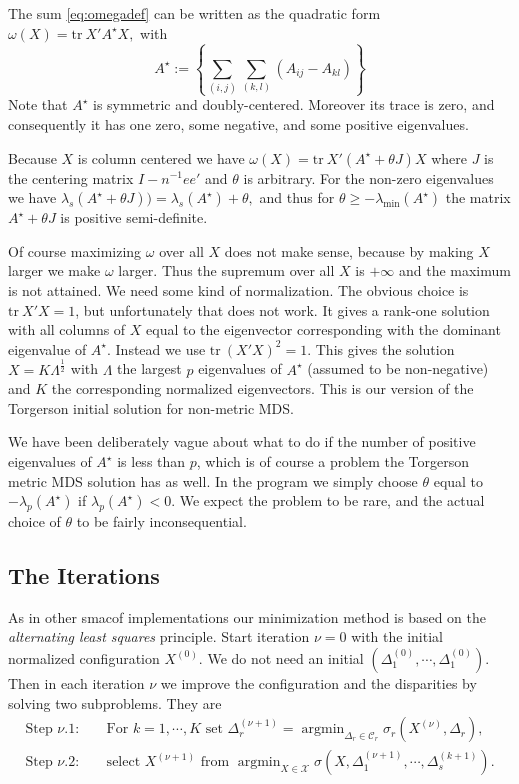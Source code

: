 \documentclass[
  12pt,
]{article}
\begin{document}
The sum \eqref{eq:omegadef} can be written as the quadratic form
\(\omega(X)=\text{tr}\ X'A^\star X,\)
with
\begin{equation}
A^\star:=\left\{\sum_{(i,j)}\sum_{(k,l)}(A_{ij}-A_{kl})\right\} 
\label{eq:astardef}
\end{equation}
Note that \(A^\star\) is symmetric and doubly-centered. Moreover
its trace is zero, and consequently it has one zero, some negative,
and some positive eigenvalues.

Because \(X\) is column centered we have
\(\omega(X)=\text{tr}\ X'(A^\star + \theta J)X\) where \(J\) is the
centering matrix \(I-n^{-1}ee'\) and \(\theta\) is arbitrary. For
the non-zero eigenvalues we have
\(\lambda_s(A^\star + \theta J))=\lambda_s(A^\star) + \theta,\)
and thus for \(\theta\geq-\lambda_{\text{min}}(A^\star)\) the matrix \(A^\star + \theta J\) is positive semi-definite.

Of course maximizing \(\omega\) over all \(X\) does not make sense, because
by making \(X\) larger we make \(\omega\) larger. Thus the supremum over all
\(X\) is \(+\infty\) and the maximum is not attained. We need some
kind of normalization. The obvious choice is \(\text{tr}\ X'X=1\), but
unfortunately that does not work. It gives a rank-one solution
with all columns of \(X\) equal to the eigenvector corresponding with the
dominant eigenvalue of \(A^\star\). Instead we use \(\text{tr}\ (X'X)^2=1\).
This gives the solution \(X=K\Lambda^\frac12\) with \(\Lambda\) the largest \(p\) eigenvalues of \(A^\star\) (assumed to be non-negative) and \(K\) the
corresponding normalized eigenvectors. This is our version of
the Torgerson initial solution for non-metric MDS.

We have been deliberately vague about what to do if the number of
positive eigenvalues of \(A^\star\) is less than \(p\), which is of
course a problem the Torgerson metric MDS solution has as well. In the
program we simply choose \(\theta\) equal to \(-\lambda_p(A^\star)\)
if \(\lambda_p(A^\star)<0\). We expect the problem to be rare, and
the actual choice of \(\theta\) to be fairly inconsequential.

\subsection{The Iterations}\label{the-iterations}

As in other smacof implementations our minimization method is based on the
\emph{alternating least squares} principle. Start
iteration \(\nu=0\) with the initial normalized configuration \(X^{(0)}\). We do not need an initial \((\Delta_1^{(0)},\cdots,\Delta_1^{(0)})\). Then in each iteration \(\nu\) we improve the configuration and the disparities by solving two subproblems. They are
\begin{align}
\text{Step  }\nu.1:\quad&\text{For }k=1,\cdots,K\text{ set } \Delta_r^{(\nu+1)}=\mathop{\text{argmin}}_{\Delta_r\in\mathcal{C}_r}\sigma_r(X^{(\nu)},\Delta_r),\label{eq:alsprob1}\\
\text{Step  }\nu.2:\quad&\text{select }X^{(\nu+1)}\text{ from }\mathop{\text{argmin}}_{X\in\mathcal{X}}\sigma(X,\Delta_1^{(\nu+1)},\cdots,\Delta_s^{(k+1)}).\label{eq:alsprob2}
\end{align}
\end{document}

